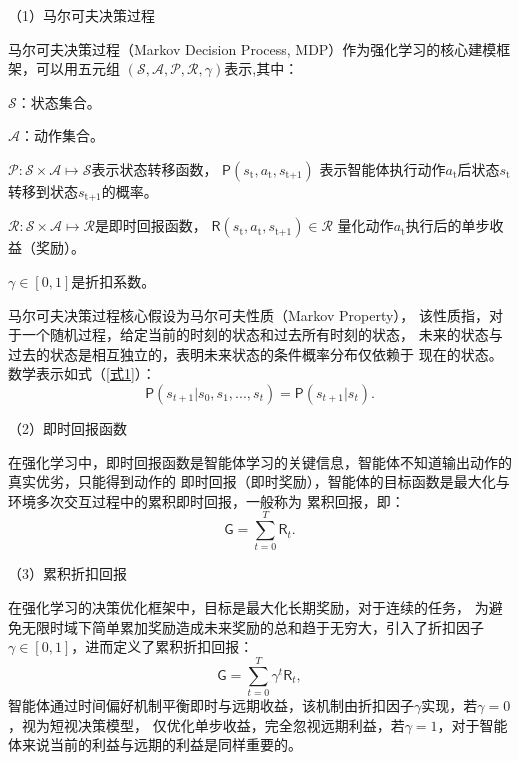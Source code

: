 （1）马尔可夫决策过程

马尔可夫决策过程（Markov Decision Process, MDP）作为强化学习的核心建模框架，可以用五元组
$( \mathcal{S},\mathcal{A},\mathcal{P},\mathcal{R},\gamma) $表示,其中：

$\mathcal{S}$：状态集合。

$\mathcal{A}$：动作集合。

$\mathcal{P}:\mathcal{S} \times \mathcal{A} \mapsto \mathcal{S}$表示状态转移函数，
$\mathsf{P} ( s_{\text{t}},a_{\text{t}},s_{\text{t+1}}) $
表示智能体执行动作$a_{\text{t}}$后状态$s_{\text{t}}$转移到状态$s_{\text{t+1}}$的概率。

$\mathcal{R}:\mathcal{S}\times \mathcal{A}\mapsto \mathcal{R}$是即时回报函数，
$\mathsf{R}  ( s_{\text{t}},a_{\text{t}},s_{\text{t+1}}) \in \mathcal{R}$
量化动作$a_{\text{t}}$执行后的单步收益（奖励）。

$\gamma \in  [ 0,1] $是折扣系数。

马尔可夫决策过程核心假设为马尔可夫性质（Markov Property），
该性质指，对于一个随机过程，给定当前的时刻的状态和过去所有时刻的状态，
未来的状态与过去的状态是相互独立的，表明未来状态的条件概率分布仅依赖于
现在的状态。数学表示如式（\ref{式1}）：
\begin{equation}\label{式1}
    \mathsf{P}(s_{t+1}| s_{0},s_{1},...,s_{t}) = \mathsf{P}(s_{t+1}| s_{t}).
\end{equation}

（2）即时回报函数

在强化学习中，即时回报函数是智能体学习的关键信息，智能体不知道输出动作的真实优劣，只能得到动作的
即时回报（即时奖励），智能体的目标函数是最大化与环境多次交互过程中的累积即时回报，一般称为
累积回报，即：
\begin{equation}\label{式2}
    \mathsf{G} = \sum_{t = 0}^{T}\mathsf{R}_{t}.   
\end{equation}

（3）累积折扣回报

在强化学习的决策优化框架中，目标是最大化长期奖励，对于连续的任务，
为避免无限时域下简单累加奖励造成未来奖励的总和趋于无穷大，引入了折扣因子$\gamma \in  [ 0,1] $，进而定义了累积折扣回报：
\begin{equation}\label{式3}
    \mathsf{G} = \sum_{t = 0}^{T}\gamma ^{t}\mathsf{R}_{t},   
\end{equation}
智能体通过时间偏好机制平衡即时与远期收益，该机制由折扣因子$\gamma$实现，若$\gamma = 0$，视为短视决策模型，
仅优化单步收益，完全忽视远期利益，若$\gamma = 1$，对于智能体来说当前的利益与远期的利益是同样重要的。

